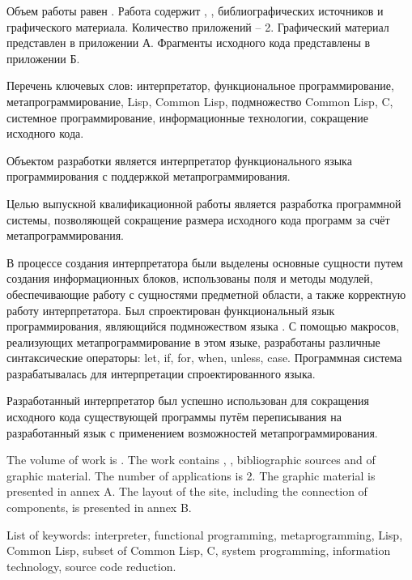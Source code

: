 
Объем работы равен . Работа содержит , ,  библиографических источников и  графического материала. Количество приложений – 2. Графический материал представлен в приложении А. Фрагменты исходного кода представлены в приложении Б.

Перечень ключевых слов: интерпретатор, функциональное программирование, метапрограммирование, Lisp, Common Lisp, подмножество Common Lisp, C, системное программирование, информационные технологии, сокращение исходного кода.

Объектом разработки является интерпретатор функционального языка программирования с поддержкой метапрограммирования.

Целью выпускной квалификационной работы является разработка программной системы, позволяющей сокращение размера исходного кода программ за счёт метапрограммирования.

В процессе создания интерпретатора были выделены основные сущности путем создания информационных блоков, использованы поля и методы модулей, обеспечивающие работу с сущностями предметной области, а также корректную работу интерпретатора. Был спроектирован функциональный язык программирования, являющийся подмножеством языка . С помощью макросов, реализующих метапрограммирование в этом языке, разработаны различные синтаксические операторы: let, if, for, when, unless, case. Программная система разрабатывалась для интерпретации спроектированного языка.

Разработанный интерпретатор был успешно использован для сокращения исходного кода существующей программы путём переписывания на разработанный язык с применением возможностей метапрограммирования.

  
The volume of work is . The work contains , ,  bibliographic sources and  of graphic material. The number of applications is 2. The graphic material is presented in annex A. The layout of the site, including the connection of components, is presented in annex B.

List of keywords: interpreter, functional programming, metaprogramming, Lisp, Common Lisp, subset of Common Lisp, C, system programming, information technology, source code reduction.


